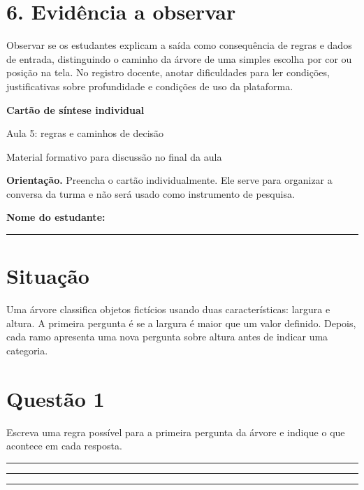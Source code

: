 \documentclass[12pt,a4paper]{article}
\newcommand{\linha}{\rule{\linewidth}{0.35pt}}
\newcommand{\bloco}[1]{%
  \vspace{0.25em}
  \noindent\colorbox{cinza}{\parbox{0.96\linewidth}{#1}}%
  \vspace{0.3em}
}
\begin{document}
\section*{6. Evidência a observar}

Observar se os estudantes explicam a saída como consequência de regras e dados de entrada, distinguindo o caminho da árvore de uma simples escolha por cor ou posição na tela. No registro docente, anotar dificuldades para ler condições, justificativas sobre profundidade e condições de uso da plataforma.

\newpage

\begin{center}
  {\LARGE\bfseries\color{azul} Cartão de síntese individual}\par
  \vspace{0.2em}
  {\large Aula 5: regras e caminhos de decisão}\par
  \vspace{0.35em}
  {\small Material formativo para discussão no final da aula}\par
\end{center}

\bloco{\textbf{Orientação.} Preencha o cartão individualmente. Ele serve para organizar a conversa da turma e não será usado como instrumento de pesquisa.}

\textbf{Nome do estudante:} \rule{8.5cm}{0.4pt}

\section*{Situação}

Uma árvore classifica objetos fictícios usando duas características: largura e altura. A primeira pergunta é se a largura é maior que um valor definido. Depois, cada ramo apresenta uma nova pergunta sobre altura antes de indicar uma categoria.

\section*{Questão 1}

Escreva uma regra possível para a primeira pergunta da árvore e indique o que acontece em cada resposta.

\vspace{0.25em}
\linha\par\vspace{0.75em}
\linha\par\vspace{0.75em}
\linha
\end{document}
